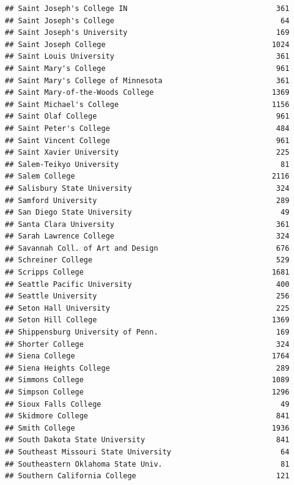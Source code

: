 \documentclass[
]{article}
\begin{document}
\begin{verbatim}
## Saint Joseph's College IN                                  361
## Saint Joseph's College                                      64
## Saint Joseph's University                                  169
## Saint Joseph College                                      1024
## Saint Louis University                                     361
## Saint Mary's College                                       961
## Saint Mary's College of Minnesota                          361
## Saint Mary-of-the-Woods College                           1369
## Saint Michael's College                                   1156
## Saint Olaf College                                         961
## Saint Peter's College                                      484
## Saint Vincent College                                      961
## Saint Xavier University                                    225
## Salem-Teikyo University                                     81
## Salem College                                             2116
## Salisbury State University                                 324
## Samford University                                         289
## San Diego State University                                  49
## Santa Clara University                                     361
## Sarah Lawrence College                                     324
## Savannah Coll. of Art and Design                           676
## Schreiner College                                          529
## Scripps College                                           1681
## Seattle Pacific University                                 400
## Seattle University                                         256
## Seton Hall University                                      225
## Seton Hill College                                        1369
## Shippensburg University of Penn.                           169
## Shorter College                                            324
## Siena College                                             1764
## Siena Heights College                                      289
## Simmons College                                           1089
## Simpson College                                           1296
## Sioux Falls College                                         49
## Skidmore College                                           841
## Smith College                                             1936
## South Dakota State University                              841
## Southeast Missouri State University                         64
## Southeastern Oklahoma State Univ.                           81
## Southern California College                                121

\end{verbatim}
\end{document}
